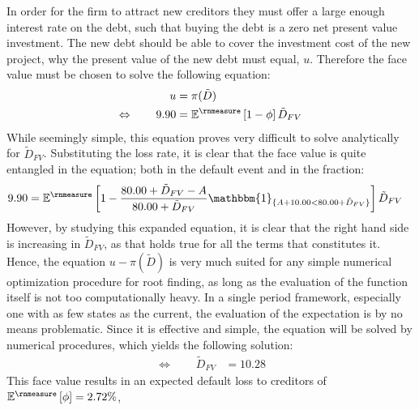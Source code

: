 \documentclass[main.tex]{subfiles}
\begin{document}
        In order for the firm to attract new creditors they must offer a large enough interest rate on the debt, 
        such that buying the debt is a zero net present value investment.
        The new debt should be able to cover the investment cost of the new project,
        why the present value of the new debt must equal, $u$.
        Therefore the face value must be chosen to solve the following equation:
            \begin{align}
                u &= \pi(\tilde{D}) \\
                \Leftrightarrow  \qquad
                9.90 &= \mathbb{E}^{\rnmeasure}\left[1 - \phi\right] \tilde{D}_{FV}
            \end{align}
        While seemingly simple, this equation proves very difficult to solve analytically for $\tilde{D}_{FV}$.
        Substituting the loss rate, it is clear that the face value is quite entangled in the equation;
        both in the default event and in the fraction:
            \begin{align}
                9.90
                &= 
                \mathbb{E}^{\rnmeasure}\left[
                    1 
                    - 
                    \frac{
                        80.00 + \tilde{D}_{FV} - A
                    }{
                        80.00 + \tilde{D}_{FV}
                    }
                    \mathbbm{1}_{\{A + 10.00 < 80.00 + \tilde{D}_{FV}\}} 
                \right] 
                \tilde{D}_{FV} 
            \end{align}
        However, by studying this expanded equation, it is clear that the right hand side 
        is increasing in $\tilde{D}_{FV}$, as that holds true for all the terms that constitutes it.
        Hence, the equation $u - \pi(\tilde{D})$ is very much suited for any simple numerical optimization procedure
        for root finding, as long as the evaluation of the function itself is not too computationally heavy.
        In a single period framework, especially one with as few states as the current,
        the evaluation of the expectation is by no means problematic.
        Since it is effective and simple, the equation will be solved by numerical procedures, 
        which yields the following solution:
            \begin{align}
                \Leftrightarrow  \qquad
                \tilde{D}_{FV} &= 10.28
            \end{align}
        This face value results in an expected default loss to creditors of 
        $\mathbb{E}^{\rnmeasure}\left[\phi\right] = 2.72\%$,
\end{document}
